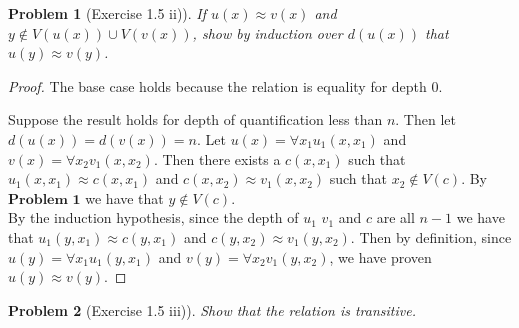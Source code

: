 \documentclass{article}
\theoremstyle{problemstyle}
\newtheorem{problem}{Problem}
\theoremstyle{lemmastyle}
\theoremstyle{theoremstyle}
\theoremstyle{problemstyle}
\begin{document}
% 
% 
% 

\begin{problem}[Exercise 1.5 ii)]
If $u(x) \approx v(x)$ and $y \notin V(u(x)) \cup V(v(x))$, show by induction over $d(u(x))$ that $u(y) \approx v(y)$.
\end{problem}

\begin{proof}
The base case holds because the relation is equality for depth $0$. 

Suppose the result holds for depth of quantification less than $n$. Then let $d(u(x)) = d(v(x)) = n$.  Let $u(x) = \forall x_1 u_1(x,x_1)$ and $v(x) = \forall x_2 v_1(x,x_2)$. Then there exists a $c(x,x_1)$  such that $u_1(x,x_1) \approx c(x,x_1)$ and $c(x,x_2) \approx v_1(x,x_2)$ such that $x_2 \notin V(c)$. By $\textbf{Problem 1}$ we have that $y \notin V(c)$.\\

By the induction hypothesis, since the depth of $u_1$ $v_1$ and $c$ are all $n-1$ we have that $u_1(y,x_1) \approx c(y,x_1)$ and $c(y,x_2) \approx v_1(y,x_2)$. Then by definition, since $u(y) = \forall x_1 u_1(y,x_1)$ and $v(y) = \forall x_2 v_1(y,x_2)$, we have proven $u(y) \approx v(y)$.
\end{proof}

\begin{problem}[Exercise 1.5 iii)]
Show that the relation is transitive. 
\end{problem}
\end{document}
